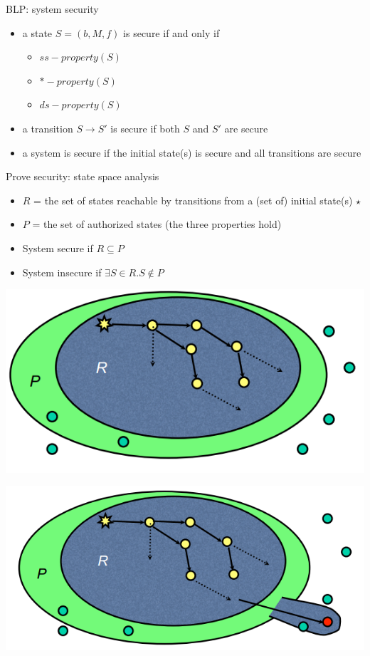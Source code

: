 \documentclass{beamer}
\begin{document}
\begin{frame}{BLP: system security}
  \begin{itemize}
  \item a state $S=(b,M,f)$ is secure if and only if 
    \begin{itemize}
      \item $ss-property(S)$
      \item $*-property(S)$
      \item $ds-property(S)$
    \end{itemize}
  \item a transition $S \rightarrow S'$ is secure if
    both $S$ and $S'$ are secure
  \item a system is secure if the initial state(s) is secure
    and all transitions are secure
  \end{itemize}
\end{frame}

\begin{frame}{Prove security: state space analysis}
  \begin{itemize}
  \item $R$ = the set of states reachable by transitions from a
    (set of) initial state(s) $\star$
  \item $P$ = the set of authorized states (the three properties hold)
  \item System secure if $R \subseteq P$
  \item System insecure if $\exists S \in R. S \not \in P$
  \end{itemize}
   {
  \begin{center}
    \includegraphics[width=0.5\linewidth]{secure_system}
  \end{center}}
   {
  \begin{center}
    \includegraphics[width=0.5\linewidth]{insicure_system}
  \end{center}}
\end{frame}
\end{document}
